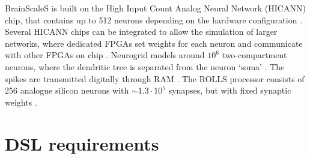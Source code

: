 \documentclass[report.tex]{subfiles}
\begin{document}
BrainScaleS is built on the High Input Count Analog Neural Network (HICANN)
chip, that contains up to 512 neurons depending on the hardware configuration 
\cite{Pfeil2013}.
Several HICANN chips can be integrated to allow the simulation of larger
networks, where dedicated \gls{FPGA}s set weights for each neuron and
communicate with other FPGAs on chip \cite{Walter2015}. 
Neurogrid models around $10^6$ two-compartment neurons, where the dendritic
tree is separated from the neuron `soma' \cite{Walter2015}.
The spikes are transmitted digitally through \gls{RAM} \cite{Walter2015}.
The ROLLS processor consists of 256 analogue silicon neurons with
$\sim1.3 \cdot 10^5$ synapses, but with fixed synaptic weights
\cite{Walter2015}.

%
%

\section{DSL requirements} \label{sec:requirements}



\end{document}
